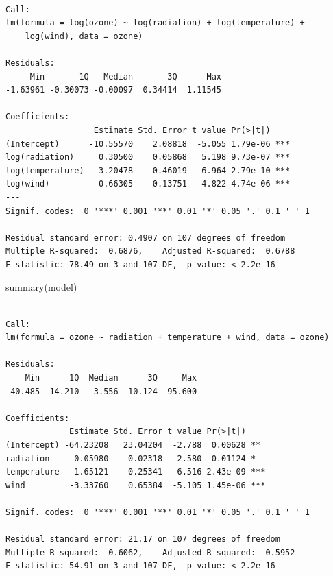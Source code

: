 \documentclass[
  a4paper,
  DIV=11,
  numbers=noendperiod]{scrartcl}
\newenvironment{Shaded}{\begin{snugshade}}{\end{snugshade}}
\newcommand{\FunctionTok}[1]{\textcolor[rgb]{0.28,0.35,0.67}{#1}}
\newcommand{\NormalTok}[1]{\textcolor[rgb]{0.00,0.23,0.31}{#1}}
\begin{document}
\begin{verbatim}

Call:
lm(formula = log(ozone) ~ log(radiation) + log(temperature) + 
    log(wind), data = ozone)

Residuals:
     Min       1Q   Median       3Q      Max 
-1.63961 -0.30073 -0.00097  0.34414  1.11545 

Coefficients:
                  Estimate Std. Error t value Pr(>|t|)    
(Intercept)      -10.55570    2.08818  -5.055 1.79e-06 ***
log(radiation)     0.30500    0.05868   5.198 9.73e-07 ***
log(temperature)   3.20478    0.46019   6.964 2.79e-10 ***
log(wind)         -0.66305    0.13751  -4.822 4.74e-06 ***
---
Signif. codes:  0 '***' 0.001 '**' 0.01 '*' 0.05 '.' 0.1 ' ' 1

Residual standard error: 0.4907 on 107 degrees of freedom
Multiple R-squared:  0.6876,    Adjusted R-squared:  0.6788 
F-statistic: 78.49 on 3 and 107 DF,  p-value: < 2.2e-16
\end{verbatim}

\begin{Shaded}
\begin{Highlighting}[]
\FunctionTok{summary}\NormalTok{(model)}
\end{Highlighting}
\end{Shaded}

\begin{verbatim}

Call:
lm(formula = ozone ~ radiation + temperature + wind, data = ozone)

Residuals:
    Min      1Q  Median      3Q     Max 
-40.485 -14.210  -3.556  10.124  95.600 

Coefficients:
             Estimate Std. Error t value Pr(>|t|)    
(Intercept) -64.23208   23.04204  -2.788  0.00628 ** 
radiation     0.05980    0.02318   2.580  0.01124 *  
temperature   1.65121    0.25341   6.516 2.43e-09 ***
wind         -3.33760    0.65384  -5.105 1.45e-06 ***
---
Signif. codes:  0 '***' 0.001 '**' 0.01 '*' 0.05 '.' 0.1 ' ' 1

Residual standard error: 21.17 on 107 degrees of freedom
Multiple R-squared:  0.6062,    Adjusted R-squared:  0.5952 
F-statistic: 54.91 on 3 and 107 DF,  p-value: < 2.2e-16
\end{verbatim}
\end{document}
